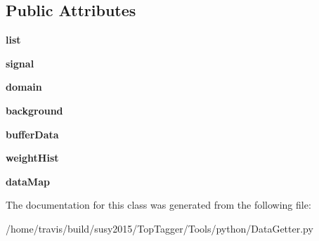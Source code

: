\subsection*{Public Attributes}
\begin{DoxyCompactItemize}
\item 
\hypertarget{classDataGetter_1_1DataGetter_a2739938ac344ad65b1d2e25e2c787419}{{\bfseries list}}\label{classDataGetter_1_1DataGetter_a2739938ac344ad65b1d2e25e2c787419}

\item 
\hypertarget{classDataGetter_1_1DataGetter_a7e7816b063af6cb91da3d8aa8d48fc2b}{{\bfseries signal}}\label{classDataGetter_1_1DataGetter_a7e7816b063af6cb91da3d8aa8d48fc2b}

\item 
\hypertarget{classDataGetter_1_1DataGetter_a0d579f0002f299b988848850aabddad8}{{\bfseries domain}}\label{classDataGetter_1_1DataGetter_a0d579f0002f299b988848850aabddad8}

\item 
\hypertarget{classDataGetter_1_1DataGetter_ab04199c95788aae9665d4c1b2677b6eb}{{\bfseries background}}\label{classDataGetter_1_1DataGetter_ab04199c95788aae9665d4c1b2677b6eb}

\item 
\hypertarget{classDataGetter_1_1DataGetter_a9d4f5ce1a7aae31b19aa9171cb0b62ac}{{\bfseries buffer\-Data}}\label{classDataGetter_1_1DataGetter_a9d4f5ce1a7aae31b19aa9171cb0b62ac}

\item 
\hypertarget{classDataGetter_1_1DataGetter_a0dfc16a5a8a63d7590cefe921ac11bef}{{\bfseries weight\-Hist}}\label{classDataGetter_1_1DataGetter_a0dfc16a5a8a63d7590cefe921ac11bef}

\item 
\hypertarget{classDataGetter_1_1DataGetter_ad47a039976844990578f9b9d5e2301c3}{{\bfseries data\-Map}}\label{classDataGetter_1_1DataGetter_ad47a039976844990578f9b9d5e2301c3}

\end{DoxyCompactItemize}


The documentation for this class was generated from the following file\-:\begin{DoxyCompactItemize}
\item 
/home/travis/build/susy2015/\-Top\-Tagger/\-Tools/python/Data\-Getter.\-py\end{DoxyCompactItemize}
